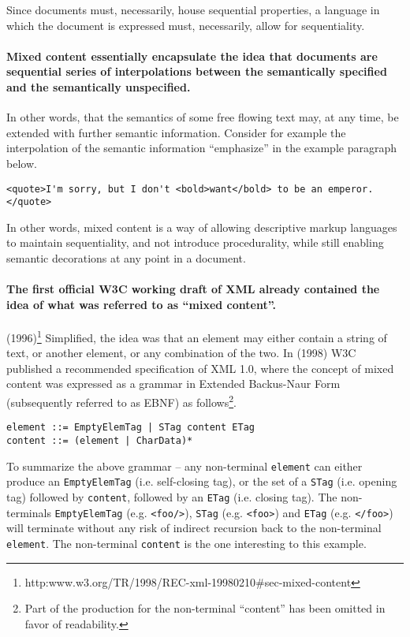 \documentclass{scrreprt}
\begin{document}
Since documents must, necessarily, house sequential properties, a language in which the document is expressed must, necessarily, allow for sequentiality.

\paragraph{Mixed content essentially encapsulate the idea that documents are sequential series of interpolations between the semantically specified and the semantically unspecified.} In other words, that the semantics of some free flowing text may, at any time, be extended with further semantic information. Consider for example the interpolation of the semantic information ``emphasize'' in the example paragraph below.

\begin{lstlisting}
<quote>I'm sorry, but I don't <bold>want</bold> to be an emperor.</quote>
\end{lstlisting}

In other words, mixed content is a way of allowing descriptive markup languages to maintain sequentiality, and not introduce procedurality, while still enabling semantic decorations at any point in a document.


\paragraph{The first official W3C working draft of XML already contained the idea of what was referred to as ``mixed content''.}(1996)\footnote{http:\/\/www.w3.org/TR/1998/REC-xml-19980210\#sec-mixed-content} Simplified, the idea was that an element may either contain a string of text, or another element, or any combination of the two. In (1998) W3C published a recommended specification of XML 1.0, where the concept of mixed content was expressed as a grammar in Extended Backus-Naur Form (subsequently referred to as EBNF) as follows\footnote{Part of the production for the non-terminal ``content'' has been omitted in favor of readability.}.

\begin{lstlisting}
element ::= EmptyElemTag | STag content ETag 
content ::= (element | CharData)*
\end{lstlisting}

To summarize the above grammar -- any non-terminal \texttt{element} can either produce an \texttt{EmptyElemTag} (i.e. self-closing tag), or the set of a \texttt{STag} (i.e. opening tag) followed by \texttt{content}, followed by an \texttt{ETag} (i.e. closing tag). The non-terminals \texttt{EmptyElemTag} (e.g. \texttt{<foo/>}), \texttt{STag} (e.g. \texttt{<foo>}) and \texttt{ETag} (e.g. \texttt{</foo>}) will terminate without any risk of indirect recursion back to the non-terminal \texttt{element}. The non-terminal \texttt{content} is the one interesting to this example.
\end{document}
